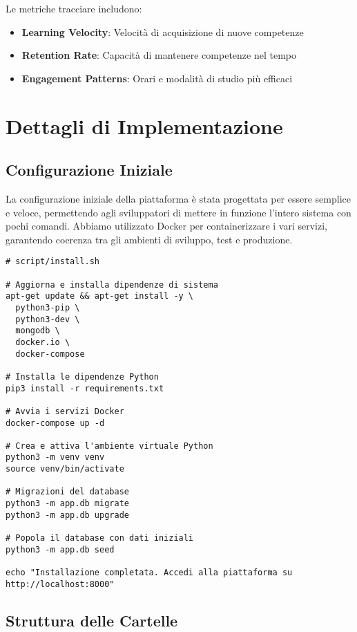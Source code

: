 \documentclass[a4paper, 14pt, oneside]{extbook}
\begin{document}
Le metriche tracciare includono:
\begin{itemize}
\item \textbf{Learning Velocity}: Velocità di acquisizione di nuove competenze
\item \textbf{Retention Rate}: Capacità di mantenere competenze nel tempo
\item \textbf{Engagement Patterns}: Orari e modalità di studio più efficaci
\end{itemize}

\chapter{Dettagli di Implementazione}

\section{Configurazione Iniziale}

La configurazione iniziale della piattaforma è stata progettata per essere semplice e veloce, permettendo agli sviluppatori di mettere in funzione l'intero sistema con pochi comandi. Abbiamo utilizzato Docker per containerizzare i vari servizi, garantendo coerenza tra gli ambienti di sviluppo, test e produzione.

\begin{lstlisting}[style=bash, caption=Script di Installazione Iniziale, label=lst:installation-script]
# script/install.sh

# Aggiorna e installa dipendenze di sistema
apt-get update && apt-get install -y \
  python3-pip \
  python3-dev \
  mongodb \
  docker.io \
  docker-compose

# Installa le dipendenze Python
pip3 install -r requirements.txt

# Avvia i servizi Docker
docker-compose up -d

# Crea e attiva l'ambiente virtuale Python
python3 -m venv venv
source venv/bin/activate

# Migrazioni del database
python3 -m app.db migrate
python3 -m app.db upgrade

# Popola il database con dati iniziali
python3 -m app.db seed

echo "Installazione completata. Accedi alla piattaforma su http://localhost:8000"
\end{lstlisting}

\section{Struttura delle Cartelle}
\end{document}
